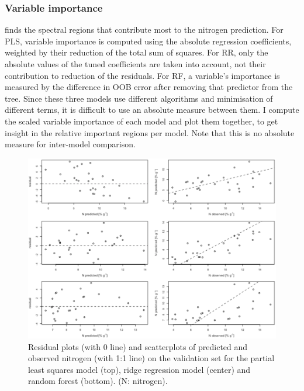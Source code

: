 \documentclass{isprs}
\begin{document}
\subsubsection{Variable importance} finds the spectral regions that contribute most to the nitrogen prediction. For PLS, variable importance is computed using the absolute regression coefficients, weighted by their reduction of the total sum of squares. For RR, only the absolute values of the tuned coefficients are taken into account, not their contribution to reduction of the residuals. For RF, a variable's importance is measured by the difference in OOB error after removing that predictor from the tree. Since these three models use different algorithms and minimisation of different terms, it is difficult to use an absolute measure between them. I compute the scaled variable importance of each model and plot them together, to get insight in the relative important regions per model. Note that this is no absolute measure for inter-model comparison.

\begin{figure}[ht!]
\begin{center}
		\includegraphics[width=2\columnwidth]{figures/test_sites/fig2.pdf}
	\caption{Residual plots (with 0 line) and scatterplots of predicted and observed nitrogen (with 1:1 line) on the validation set for the partial least squares model (top), ridge regression model (center) and random forest (bottom). (N: nitrogen).}
\label{fig:figure_placement}
\end{center}
\end{figure}
\end{document}
